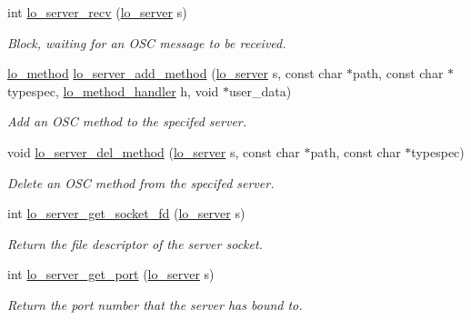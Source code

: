 \begin{CompactItemize}
int \hyperlink{group__liblolowlevel_gebef3611d24e4b5f60f16cce76a9e271}{lo\_\-server\_\-recv} (\hyperlink{lo__types_8h_59067bf50cf8abb4371da6f03c9036c9}{lo\_\-server} s)
\begin{CompactList}\small\item\em Block, waiting for an OSC message to be received. \item\end{CompactList}\item 
\hyperlink{lo__types_8h_66faedf5da13231d8c0166870477dce5}{lo\_\-method} \hyperlink{group__liblolowlevel_g0c183cabaac67eb9aad3265ae1efa580}{lo\_\-server\_\-add\_\-method} (\hyperlink{lo__types_8h_59067bf50cf8abb4371da6f03c9036c9}{lo\_\-server} s, const char $\ast$path, const char $\ast$typespec, \hyperlink{lo__types_8h_4551cfeeee8917dea22bf1c7e858fd2b}{lo\_\-method\_\-handler} h, void $\ast$user\_\-data)
\begin{CompactList}\small\item\em Add an OSC method to the specifed server. \item\end{CompactList}\item 
void \hyperlink{group__liblolowlevel_gf834a6d62de7dcceaede62325e74c763}{lo\_\-server\_\-del\_\-method} (\hyperlink{lo__types_8h_59067bf50cf8abb4371da6f03c9036c9}{lo\_\-server} s, const char $\ast$path, const char $\ast$typespec)
\begin{CompactList}\small\item\em Delete an OSC method from the specifed server. \item\end{CompactList}\item 
int \hyperlink{group__liblolowlevel_ge11ca5a5b4ec2943d5a04642ba5052ae}{lo\_\-server\_\-get\_\-socket\_\-fd} (\hyperlink{lo__types_8h_59067bf50cf8abb4371da6f03c9036c9}{lo\_\-server} s)
\begin{CompactList}\small\item\em Return the file descriptor of the server socket. \item\end{CompactList}\item 
int \hyperlink{group__liblolowlevel_g532ef6e1b8675b23e65dd19eeb648c1d}{lo\_\-server\_\-get\_\-port} (\hyperlink{lo__types_8h_59067bf50cf8abb4371da6f03c9036c9}{lo\_\-server} s)
\begin{CompactList}\small\item\em Return the port number that the server has bound to. \item\end{CompactList}\item 

\end{CompactItemize}
